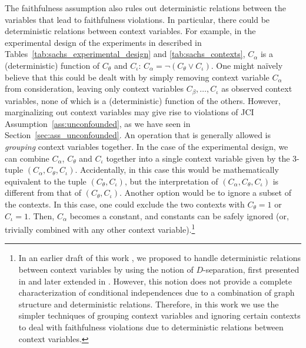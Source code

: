 \documentclass[twoside,11pt]{article}
\begin{document}
The faithfulness assumption also rules out deterministic 
relations between the variables that lead to faithfulness violations. In particular, there could be 
deterministic relations between context variables.
For example, in the experimental design of the experiments in \citet{SPP05}
described in Tables~\ref{tab:sachs_experimental_design} and \ref{tab:sachs_contexts}, $C_\alpha$ is a (deterministic) function of $C_\theta$ and $C_\iota$:
$C_\alpha = \lnot (C_\theta \lor C_\iota)$. One might na\"ively believe that this could be dealt with by simply removing
context variable $C_\alpha$ from consideration, leaving only context variables $C_\beta,\dots,C_\iota$ as observed context variables, 
none of which is a (deterministic) function of the others. However, marginalizing out context variables may give
rise to violations of JCI Assumption~\ref{ass:unconfounded}, as we have seen in Section~\ref{sec:ass_unconfounded}.
An operation that is generally allowed is \emph{grouping} context variables together. In the case of the \citet{SPP05} experimental
design, we can combine
$C_\alpha$, $C_\theta$ and $C_\iota$ together into a single context variable given by the 3-tuple $(C_\alpha,C_\theta,C_\iota)$. Accidentally,
in this case this would be mathematically equivalent to the tuple $(C_\theta,C_\iota)$, 
but the interpretation of $(C_\alpha,C_\theta,C_\iota)$ is different from that of $(C_\theta,C_\iota)$. Another option would be
to ignore a subset of the contexts. In this case, one could exclude the two contexts with $C_\theta=1$ or $C_\iota=1$. Then, 
$C_\alpha$ becomes a constant, and constants can be safely ignored (or, trivially combined with any other context variable).\footnote{In an earlier draft of this work \citep{Magliacane++_1611.10351v1}, we proposed to handle deterministic relations between context variables by using 
the notion of $D$-separation, first presented in \citep{Geiger1990} and later extended in \citep{SGS2000}. However,
this notion does not provide a complete characterization of conditional independences due to a combination of graph
structure and deterministic relations. Therefore, in this work we use the simpler techniques of grouping context variables
and ignoring certain contexts to deal with faithfulness violations due to deterministic relations between context variables.}
\end{document}
